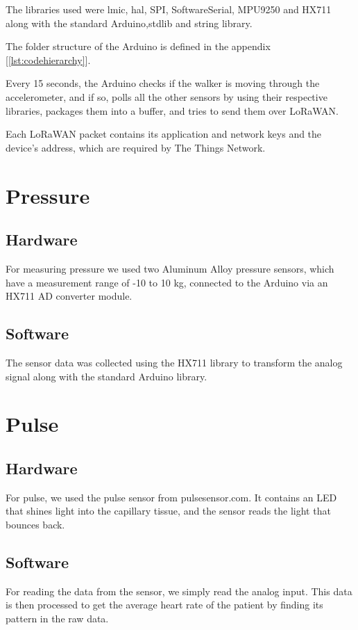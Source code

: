 		The libraries used were lmic, hal, SPI, SoftwareSerial, MPU9250 and HX711 along with the standard Arduino,stdlib and string library.

		The folder structure of the Arduino is defined in the appendix [\ref{lst:codehierarchy}]. 

		Every 15 seconds, the Arduino checks if the walker is moving through the accelerometer, and if so, polls all the other sensors by using their respective libraries, packages them into a buffer, and tries to send them over LoRaWAN.

		Each LoRaWAN packet contains its application and network keys and the device's address, which are required by The Things Network.

\section{Pressure}
	\subsection{Hardware}
	For measuring pressure we used two Aluminum Alloy pressure sensors, which have a measurement range of -10 to 10 kg, connected to the Arduino via an HX711 AD converter module. 

	\subsection{Software}
	The sensor data was collected using the HX711 library to transform the analog signal along with the standard Arduino library. 

\section{Pulse}

	\subsection{Hardware}
	For pulse, we used the pulse sensor from pulsesensor.com. It contains an LED that shines light into the capillary tissue, and the sensor reads the light that bounces back.

	\subsection{Software}
	For reading the data from the sensor, we simply read the analog input. This data is then processed to get the average heart rate of the patient by finding its pattern in the raw data.

